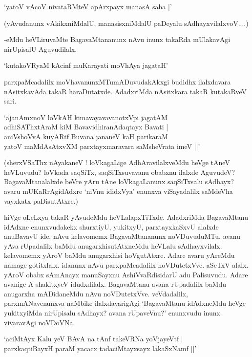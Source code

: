 \begin{shloka}
`yatoV vAcoV nivataRMteV apArxpayx manasA saha |'
\end{shloka}

(yAvudanunx vAkikxniMdalU, manasisxniMdalU paDeyalu sAdhayxvilalxvoV....)

-eMdu heVLiruvaMte BagavaMtananunx nAvu inunx takaRda mUlakavAgi nirUpisalU Aguvudilalx.

\begin{shloka}
`kutakoVR\s yaM kAcinf muKarayati moVhAya jagataH'
\end{shloka}

parxpaMcadalilx moVhavanunxMTumADuvudakAkxgi budidhx ilalxdavara nAsitxkavAda takaR haraDutatxde. AdadxriMda nAsitxkara takaR kutakaRveV sari.

\begin{shloka}
`ajanAmxnoV loVkAH kimavayavavanotxV\s pi jagatAM\\
adhiSAThxtAraM kiM BavavidhiranAdaqtayx Bavati |\\
aniVshoVvA kuyARtf Buvana jananeV kaH parikaraM\\
yatoV maMdAsAtxvXM parxtayxmaravara saMsheVrata imeV ||'
\end{shloka}

(sherxVSaThx nAyakaneV ! loVkagaLige AdhAravilalxveMdu heVge tAneV heVLuvudu? loVkada saqSiTx, saqSiTxsuvavanu obabxnu ilalxde AguvudeV? BagavaMtanalalxde beVre yAru tAne loVkagaLanunx saqSiTxsalu sAdhayx? avaru mUKaRrAgidAdxre `niVnu ididxVya' enunxva viSayadalilx saMdeVha vayxkatx paDisutAtxre.)

hiVge oLeLxya takaR yAvudeMdu heVLalapxTiTxde. AdadxriMda BagavaMtanu idAdxne enunxvudakekx shurxtiyU, yukitxyU, parxtayxkaSxvU alalxde anuBavavU ide. nAvu kelavomemx BagavaMtananunx noVDuvuduMTu. avanu yAva rUpadalilx baMdu anugarxhisutAtxneMdu heVLalu sAdhayxvilalx. kelavomemx yAroV baMdu anugarxhisi hoVgutAtxre. Adare avaru yAreMdu namage gotitxlalx. idanunx nAvu parxpaMcadalilx noVDutetxVve. aSeTxV alalx. yAroV obabx sAmAnayx manuSayxnu AshiVvaRdisidarU adu Palisuvudu. Adare avanige A shakitxyeV idudxdilalx. BagavaMtanu avana rUpadalilx baMdu anugarxha mADidaneMdu nAvu noVDutetxVve. veVdadalilx, parxmANavenunxva naMbike ilalxdavarigAgi `BagavaMtanu idAdxneMdu heVge yukitxyiMda nirUpisalu sAdhayx? avana rUpaveVnu?' enunxvudu inunx vivaravAgi noVDoVNa.

\begin{shloka}
`aciMtAyx Kalu yeV BAvA na tAnf takeVRNa yoVjayeVtf |\\
parxkaqtiBayxH paraM yacacx tadaciMtayxsayx lakaSxNamf ||'
\end{shloka}

